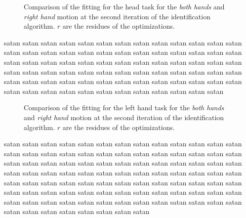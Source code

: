 \documentclass[letterpaper, 10pt, conference]{ieeeconf}      %
\begin{document}
\begin{figure}[t]
  \centering
\caption{Comparison of the fitting for the head task for the \emph{both hands} and \emph{right hand} motion at the second iteration of the identification algorithm.
$r$ are the residues of the optimizations.}
\label{fig:exp1:taskHead1}
\end{figure}

satan satan satan satan satan satan satan satan satan satan satan
satan satan satan satan satan satan satan satan satan satan satan
satan satan satan satan satan satan satan satan satan satan satan
satan satan satan satan satan satan satan satan satan satan satan
satan satan satan satan satan satan satan satan satan satan satan
satan satan satan satan satan satan satan satan satan satan satan
satan satan satan satan satan satan satan satan satan satan satan

\begin{figure}[t]
  \centering
  \caption{Comparison of the fitting for the left hand task for the
    \emph{both hands} and \emph{right hand} motion at the second
    iteration of the identification algorithm.  $r$ are
    the residues of the optimizations.}
  \label{fig:exp1:taskLhand1}
\end{figure}

satan satan satan satan satan satan satan satan satan satan satan
satan satan satan satan satan satan satan satan satan satan satan
satan satan satan satan satan satan satan satan satan satan satan
satan satan satan satan satan satan satan satan satan satan satan
satan satan satan satan satan satan satan satan satan satan satan
satan satan satan satan satan satan satan satan satan satan satan
satan satan satan satan satan satan satan satan satan satan satan
satan satan satan satan satan satan satan satan satan satan satan
satan satan satan satan satan satan satan satan satan satan satan
\end{document}
